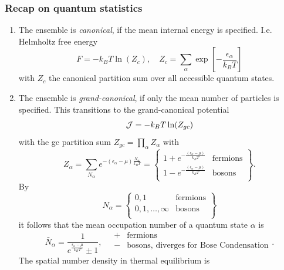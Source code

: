 \subsubsection{Recap on quantum statistics}
\begin{enumerate}
	\item The ensemble is \emph{canonical}, if the mean internal energy is specified. I.e. Helmholtz free energy
	\begin{equation}
		F=-k_B T \ln(Z_c),\quad Z_c=\sum_\alpha \exp[-\frac{\epsilon_\alpha}{k_B T}]
	\end{equation}
	with $Z_c$ the canonical partition sum over all accessible quantum states.
	\item The ensemble is \emph{grand-canonical}, if only the mean number of particles is specified. This transitions to the grand-canonical potential
	\begin{equation}
		\mathcal{J} = - k_B T \ln(Z_{gc})
	\end{equation}
	with the gc partition sum $Z_{gc} = \prod_\alpha Z_\alpha$ with
	\begin{equation}
		Z_\alpha = \sum_{N_\alpha} e^{-(\epsilon_\alpha-\mu) \frac{N_\alpha}{k_B T}} = \left\{	\begin{array}{ll}
	1+e^{-\frac{(\epsilon_\alpha-\mu)}{k_B T}} & \text{fermions} \\
	1-e^{-\frac{(\epsilon_\alpha-\mu)}{k_B T}} & \text{bosons} \\
		\end{array}		\right\}.
	\end{equation}
	By 
	\begin{equation}
		N_\alpha = \left\{ \begin{array}{ll}
		0,1 & \text{fermions} \\
		0,1,\dots,\infty & \text{bosons} \\
		\end{array}			\right\}
	\end{equation}
	it follows that the mean occupation number of a quantum state $\alpha$ is
	\begin{equation}
		\bar{N}_\alpha= \frac{1}{e^{\frac{\epsilon_\alpha-\mu}{k_B T}} \pm 1}, \quad \begin{array}{ll}
		+ & \text{fermions}\\
		- & \text{bosons, diverges for Bose Condensation}\\
		\end{array}.
	\end{equation}
	The spatial number density in thermal equilibrium is

\end{enumerate}
